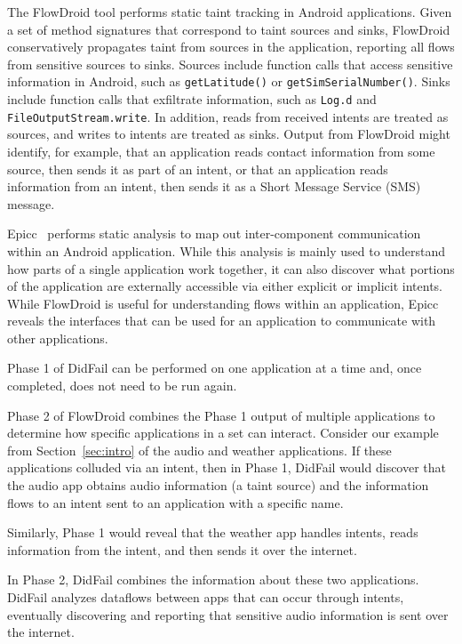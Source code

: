 The FlowDroid tool performs static taint tracking in Android applications. Given a set of method signatures that correspond to taint sources and sinks, FlowDroid conservatively propagates taint from sources in the application, reporting all flows from sensitive sources to sinks. Sources include function calls that access sensitive information in Android, such as \texttt{getLatitude()} or \texttt{getSimSerialNumber()}. Sinks include function calls that exfiltrate information, such as \texttt{Log.d} and \texttt{FileOutputStream.write}. In addition, reads from received intents are treated as sources, and writes to intents are treated as sinks. Output from FlowDroid might identify, for example, that an application reads contact information from some source, then sends it as part of an intent, or that an application reads information from an intent, then sends it as a Short Message Service (SMS) message.

Epicc~\cite{epicc} performs static analysis to map out inter-component communication within an Android application. While this analysis is mainly used to understand how parts of a single application work together, it can also discover what portions of the application are externally accessible via either explicit or implicit intents. While FlowDroid is useful for understanding flows within an application, Epicc reveals the interfaces that can be used for an application to communicate with other applications.

Phase 1 of DidFail can be performed on one application at a time and, once completed, does not need to be run again.

Phase 2 of FlowDroid combines the Phase 1 output of multiple applications to determine how specific applications in a set can interact. Consider our example from Section~\ref{sec:intro} of the audio and weather applications. If these applications colluded via an intent, then in Phase 1, DidFail would discover that the audio app obtains audio information (a taint source) and the information flows to an intent sent to an application with a specific name.

Similarly, Phase 1 would reveal that the weather app handles intents, reads information from the intent, and then sends it over the internet. 

In Phase 2, DidFail combines the information about these two applications. DidFail analyzes dataflows between apps that can occur through intents, eventually discovering and reporting that sensitive audio information is sent over the internet.

